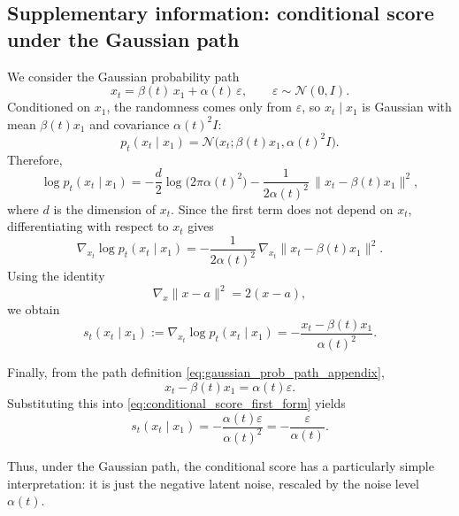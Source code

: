 \subsection{Supplementary information: conditional score under the Gaussian path}
\label{subsec:si-gaussian-conditional-score}

We consider the Gaussian probability path
\begin{equation}
  x_t = \beta(t)\,x_1 + \alpha(t)\,\varepsilon,
  \qquad
  \varepsilon \sim \mathcal{N}(0,I).
  \label{eq:gaussian_prob_path_appendix}
\end{equation}
Conditioned on $x_1$, the randomness comes only from $\varepsilon$, so $x_t \mid x_1$ is Gaussian with mean $\beta(t)x_1$ and covariance $\alpha(t)^2 I$:
\begin{equation}
  p_t(x_t \mid x_1)
  =
  \mathcal{N}\!\bigl(x_t;\beta(t)x_1,\alpha(t)^2 I\bigr).
\end{equation}
Therefore,
\begin{equation}
  \log p_t(x_t \mid x_1)
  =
  -\frac{d}{2}\log\!\bigl(2\pi \alpha(t)^2\bigr)
  -\frac{1}{2\alpha(t)^2}\,
  \|x_t-\beta(t)x_1\|^2,
\end{equation}
where $d$ is the dimension of $x_t$. Since the first term does not depend on $x_t$, differentiating with respect to $x_t$ gives
\begin{equation}
  \nabla_{x_t}\log p_t(x_t \mid x_1)
  =
  -\frac{1}{2\alpha(t)^2}\,
  \nabla_{x_t}\|x_t-\beta(t)x_1\|^2.
\end{equation}
Using the identity
\[
\nabla_x \|x-a\|^2 = 2(x-a),
\]
we obtain
\begin{equation}
  s_t(x_t \mid x_1)
  :=
  \nabla_{x_t}\log p_t(x_t \mid x_1)
  =
  -\frac{x_t-\beta(t)x_1}{\alpha(t)^2}.
  \label{eq:conditional_score_first_form}
\end{equation}

Finally, from the path definition \eqref{eq:gaussian_prob_path_appendix},
\[
x_t-\beta(t)x_1=\alpha(t)\varepsilon.
\]
Substituting this into \eqref{eq:conditional_score_first_form} yields
\begin{equation}
  s_t(x_t \mid x_1)
  =
  -\frac{\alpha(t)\varepsilon}{\alpha(t)^2}
  =
  -\frac{\varepsilon}{\alpha(t)}.
  \label{eq:conditional_score_simple_appendix}
\end{equation}

Thus, under the Gaussian path, the conditional score has a particularly simple interpretation: it is just the negative latent noise, rescaled by the noise level $\alpha(t)$.

